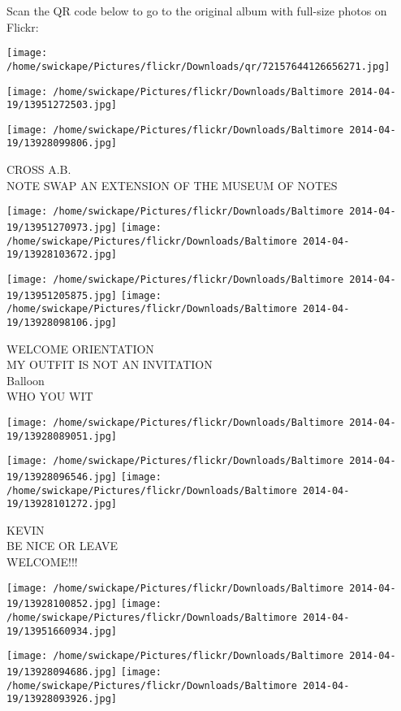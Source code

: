 \documentclass[10pt,letterpaper]{article}
\begin{document}
Scan the QR code below to go to the original album with full-size photos on Flickr:

\texttt{[image: /home/swickape/Pictures/flickr/Downloads/qr/72157644126656271.jpg]}
\pagebreak

\texttt{[image: /home/swickape/Pictures/flickr/Downloads/Baltimore 2014-04-19/13951272503.jpg]}

\vspace{0.25in}
\texttt{[image: /home/swickape/Pictures/flickr/Downloads/Baltimore 2014-04-19/13928099806.jpg]}

CROSS A.B.\\
NOTE SWAP AN EXTENSION OF THE MUSEUM OF NOTES
\pagebreak

\texttt{[image: /home/swickape/Pictures/flickr/Downloads/Baltimore 2014-04-19/13951270973.jpg]}
\texttt{[image: /home/swickape/Pictures/flickr/Downloads/Baltimore 2014-04-19/13928103672.jpg]}

\texttt{[image: /home/swickape/Pictures/flickr/Downloads/Baltimore 2014-04-19/13951205875.jpg]}
\texttt{[image: /home/swickape/Pictures/flickr/Downloads/Baltimore 2014-04-19/13928098106.jpg]}

WELCOME ORIENTATION\\
MY OUTFIT IS NOT AN INVITATION\\
Balloon\\
WHO YOU WIT
\pagebreak

\texttt{[image: /home/swickape/Pictures/flickr/Downloads/Baltimore 2014-04-19/13928089051.jpg]}

\vspace{0.25in}
\texttt{[image: /home/swickape/Pictures/flickr/Downloads/Baltimore 2014-04-19/13928096546.jpg]}
\texttt{[image: /home/swickape/Pictures/flickr/Downloads/Baltimore 2014-04-19/13928101272.jpg]}

KEVIN\\
BE NICE OR LEAVE\\
WELCOME!!!
\pagebreak

\texttt{[image: /home/swickape/Pictures/flickr/Downloads/Baltimore 2014-04-19/13928100852.jpg]}
\texttt{[image: /home/swickape/Pictures/flickr/Downloads/Baltimore 2014-04-19/13951660934.jpg]}

\texttt{[image: /home/swickape/Pictures/flickr/Downloads/Baltimore 2014-04-19/13928094686.jpg]}
\texttt{[image: /home/swickape/Pictures/flickr/Downloads/Baltimore 2014-04-19/13928093926.jpg]}
\end{document}
